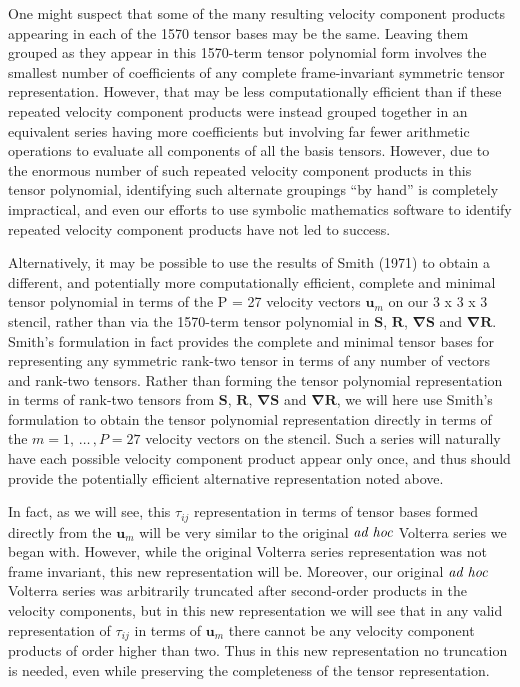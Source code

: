One might suspect that some of the many resulting velocity component products appearing in each of the 1570 tensor bases may be the same. Leaving them grouped as they appear in this 1570-term tensor polynomial form involves the smallest number of coefficients of any complete frame-invariant symmetric tensor representation. However, that may be less computationally efficient than if these repeated velocity component products were instead grouped together in an equivalent series having more coefficients but involving far fewer arithmetic operations to evaluate all components of all the basis tensors. However, due to the enormous number of such repeated velocity component products in this tensor polynomial, identifying such alternate groupings “by hand” is completely impractical, and even our efforts to use symbolic mathematics software to identify repeated velocity component products have not led to success.

Alternatively, it may be possible to use the results of Smith (1971) to obtain a different, and potentially more computationally efficient, complete and minimal tensor polynomial in terms of the P = 27 velocity vectors $\mathbf{u}_m$ on our 3 x 3 x 3   stencil, rather than via the 1570-term tensor polynomial in $\mathbf{S}$, $\mathbf{R}$, $\mathbf{\nabla S}$ and $\mathbf{\nabla R}$. Smith’s formulation in fact provides the complete and minimal tensor bases for representing any symmetric rank-two tensor in terms of any number of vectors and rank-two tensors.  Rather than forming the tensor polynomial representation in terms of rank-two tensors from $\mathbf{S}$, $\mathbf{R}$, $\mathbf{\nabla S}$ and $\mathbf{\nabla R}$, we will here use Smith’s formulation to obtain the tensor polynomial representation directly in terms of the $m = 1, \,\dots\, , P = 27$ velocity vectors   on the stencil.  Such a series will naturally have each possible velocity component product appear only once, and thus should provide the potentially efficient alternative representation noted above.

In fact, as we will see, this $\tau_{ij}$ representation in terms of tensor bases formed directly from the $\mathbf{u}_m$  will be very similar to the original $\emph{ad hoc}$ Volterra series we began with.  However, while the original Volterra series representation was not frame invariant, this new representation will be. Moreover, our original $\emph{ad hoc}$ Volterra series was arbitrarily truncated after second-order products in the velocity components, but in this new representation we will see that in any valid representation of $\tau_{ij}$  in terms of $\mathbf{u}_m$ there cannot be any velocity component products of order higher than two. Thus in this new representation no truncation is needed, even while preserving the completeness of the tensor representation.

